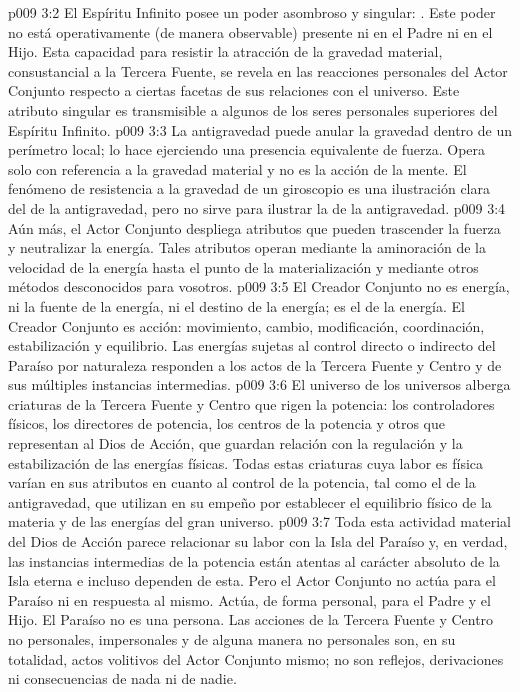 \vs p009 3:2 \pc El Espíritu Infinito posee un poder asombroso y singular: . Este poder no está operativamente (de manera observable) presente ni en el Padre ni en el Hijo. Esta capacidad para resistir la atracción de la gravedad material, consustancial a la Tercera Fuente, se revela en las reacciones personales del Actor Conjunto respecto a ciertas facetas de sus relaciones con el universo. Este atributo singular es transmisible a algunos de los seres personales superiores del Espíritu Infinito.
\vs p009 3:3 \pc La antigravedad puede anular la gravedad dentro de un perímetro local; lo hace ejerciendo una presencia equivalente de fuerza. Opera solo con referencia a la gravedad material y no es la acción de la mente. El fenómeno de resistencia a la gravedad de un giroscopio es una ilustración clara del  de la antigravedad, pero no sirve para ilustrar la  de la antigravedad.
\vs p009 3:4 Aún más, el Actor Conjunto despliega atributos que pueden trascender la fuerza y neutralizar la energía. Tales atributos operan mediante la aminoración de la velocidad de la energía hasta el punto de la materialización y mediante otros métodos desconocidos para vosotros.
\vs p009 3:5 \pc El Creador Conjunto no es energía, ni la fuente de la energía, ni el destino de la energía; es el  de la energía. El Creador Conjunto es acción: movimiento, cambio, modificación, coordinación, estabilización y equilibrio. Las energías sujetas al control directo o indirecto del Paraíso por naturaleza responden a los actos de la Tercera Fuente y Centro y de sus múltiples instancias intermedias.
\vs p009 3:6 El universo de los universos alberga criaturas de la Tercera Fuente y Centro que rigen la potencia: los controladores físicos, los directores de potencia, los centros de la potencia y otros que representan al Dios de Acción, que guardan relación con la regulación y la estabilización de las energías físicas. Todas estas criaturas cuya labor es física varían en sus atributos en cuanto al control de la potencia, tal como el de la antigravedad, que utilizan en su empeño por establecer el equilibrio físico de la materia y de las energías del gran universo.
\vs p009 3:7 Toda esta actividad material del Dios de Acción parece relacionar su labor con la Isla del Paraíso y, en verdad, las instancias intermedias de la potencia están atentas al carácter absoluto de la Isla eterna e incluso dependen de esta. Pero el Actor Conjunto no actúa para el Paraíso ni en respuesta al mismo. Actúa, de forma personal, para el Padre y el Hijo. El Paraíso no es una persona. Las acciones de la Tercera Fuente y Centro no personales, impersonales y de alguna manera no personales son, en su totalidad, actos volitivos del Actor Conjunto mismo; no son reflejos, derivaciones ni consecuencias de nada ni de nadie.
